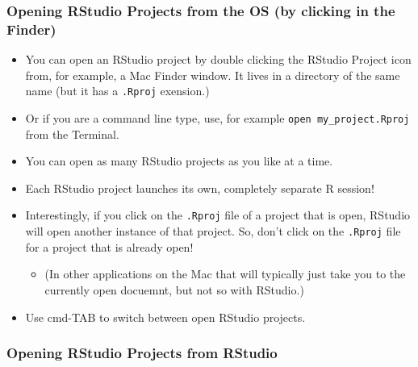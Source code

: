 \documentclass[]{book}
\providecommand{\tightlist}{%
  \setlength{\itemsep}{0pt}\setlength{\parskip}{0pt}}
\theoremstyle{definition}
\theoremstyle{definition}
\theoremstyle{remark}
\begin{document}
\subsubsection{Opening RStudio Projects from the OS (by clicking in the
Finder)}\label{opening-rstudio-projects-from-the-os-by-clicking-in-the-finder}

\begin{itemize}
\tightlist
\item
  You can open an RStudio project by double clicking the RStudio Project
  icon from, for example, a Mac Finder window. It lives in a directory
  of the same name (but it has a \texttt{.Rproj} exension.)
\item
  Or if you are a command line type, use, for example
  \texttt{open\ my\_project.Rproj} from the Terminal.
\item
  You can open as many RStudio projects as you like at a time.
\item
  Each RStudio project launches its own, completely separate R session!
\item
  Interestingly, if you click on the \texttt{.Rproj} file of a project
  that is open, RStudio will open another instance of that project. So,
  don't click on the \texttt{.Rproj} file for a project that is already
  open!

  \begin{itemize}
  \tightlist
  \item
    (In other applications on the Mac that will typically just take you
    to the currently open docuemnt, but not so with RStudio.)
  \end{itemize}
\item
  Use cmd-TAB to switch between open RStudio projects.
\end{itemize}

\subsubsection{Opening RStudio Projects from
RStudio}\label{opening-rstudio-projects-from-rstudio}
\end{document}
